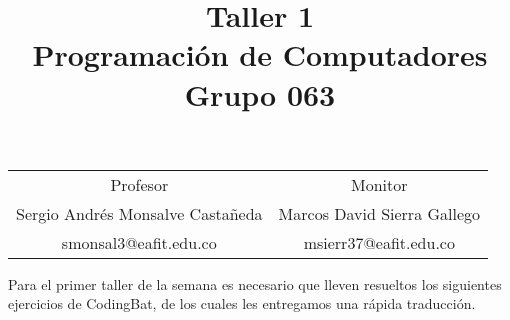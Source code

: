 \documentclass[11pt,letterpaper]{article}
\title{
	Taller 1\\  
	Programación de Computadores\\
	Grupo 063
}
\begin{document}
 
\pagestyle{fancyplain}
\fancyhf{}
\headheight=20pt %
\renewcommand{\headrulewidth}{0pt} %



\maketitle


%


\begin{center}
\begin{tabular}{c c}
	Profesor & Monitor \\
	Sergio Andrés Monsalve Castañeda & Marcos David Sierra Gallego\\
	smonsal3@eafit.edu.co & msierr37@eafit.edu.co
\end{tabular}
\end{center}
\vspace{1cm} 

Para el primer taller de la semana es necesario que lleven resueltos los siguientes ejercicios de CodingBat\cite{Codingbat}, de los cuales les entregamos una rápida traducción.
\end{document}
